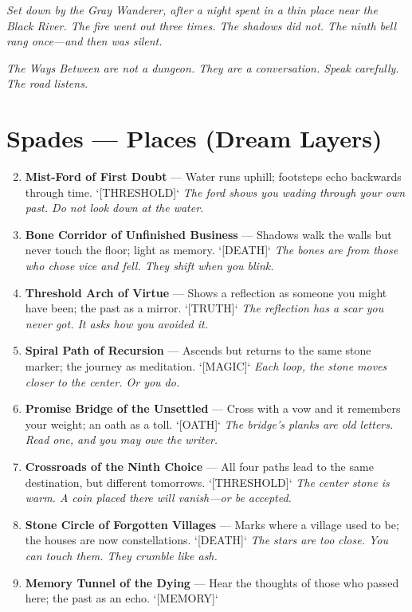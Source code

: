 \vspace{2mm}
\noindent\textit{Set down by the Gray Wanderer, after a night spent in a thin place near the Black River. The fire went out three times. The shadows did not. The ninth bell rang once---and then was silent.}

\noindent\textit{The Ways Between are not a dungeon. They are a conversation. Speak carefully. The road listens.}

\section*{Spades --- Places (Dream Layers)}
\label{sec:ways-between-places}
\begin{enumerate}
\setcounter{enumi}{1}
\item \textbf{Mist-Ford of First Doubt} --- Water runs uphill; footsteps echo backwards through time. `[THRESHOLD]`
  \hfill \textit{The ford shows you wading through your own past. Do not look down at the water.}
\item \textbf{Bone Corridor of Unfinished Business} --- Shadows walk the walls but never touch the floor; light as memory. `[DEATH]`
  \hfill \textit{The bones are from those who chose vice and fell. They shift when you blink.}
\item \textbf{Threshold Arch of Virtue} --- Shows a reflection as someone you might have been; the past as a mirror. `[TRUTH]`
  \hfill \textit{The reflection has a scar you never got. It asks how you avoided it.}
\item \textbf{Spiral Path of Recursion} --- Ascends but returns to the same stone marker; the journey as meditation. `[MAGIC]`
  \hfill \textit{Each loop, the stone moves closer to the center. Or you do.}
\item \textbf{Promise Bridge of the Unsettled} --- Cross with a vow and it remembers your weight; an oath as a toll. `[OATH]`
  \hfill \textit{The bridge's planks are old letters. Read one, and you may owe the writer.}
\item \textbf{Crossroads of the Ninth Choice} --- All four paths lead to the same destination, but different tomorrows. `[THRESHOLD]`
  \hfill \textit{The center stone is warm. A coin placed there will vanish---or be accepted.}
\item \textbf{Stone Circle of Forgotten Villages} --- Marks where a village used to be; the houses are now constellations. `[DEATH]`
  \hfill \textit{The stars are too close. You can touch them. They crumble like ash.}
\item \textbf{Memory Tunnel of the Dying} --- Hear the thoughts of those who passed here; the past as an echo. `[MEMORY]`

\end{enumerate}
